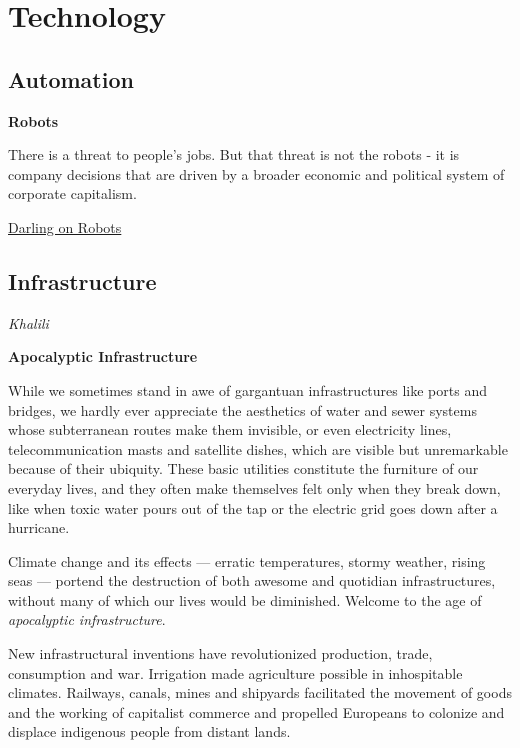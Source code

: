 \documentclass[
]{book}
\begin{document}
\hypertarget{technology}{%
\chapter{Technology}\label{technology}}

\hypertarget{automation}{%
\section{Automation}\label{automation}}

\textbf{Robots}

There is a threat to people's jobs. But that threat is not the robots - it is company decisions that are driven by a broader economic and political system of corporate capitalism.

\href{https://www.theguardian.com/technology/2021/apr/17/ai-ethicist-kate-darling-robots-can-be-our-partners}{Darling on Robots}

\hypertarget{infrastructure}{%
\section{Infrastructure}\label{infrastructure}}

\emph{Khalili}

\textbf{Apocalyptic Infrastructure}

While we sometimes stand in awe of gargantuan infrastructures like ports and bridges, we hardly ever appreciate the aesthetics of water and sewer systems whose subterranean routes make them invisible, or even electricity lines, telecommunication masts and satellite dishes, which are visible but unremarkable because of their ubiquity. These basic utilities constitute the furniture of our everyday lives, and they often make themselves felt only when they break down, like when toxic water pours out of the tap or the electric grid goes down after a hurricane.

Climate change and its effects --- erratic temperatures, stormy weather, rising seas --- portend the destruction of both awesome and quotidian infrastructures, without many of which our lives would be diminished. Welcome to the age of \emph{apocalyptic infrastructure}.

New infrastructural inventions have revolutionized production, trade, consumption and war. Irrigation made agriculture possible in inhospitable climates. Railways, canals, mines and shipyards facilitated the movement of goods and the working of capitalist commerce and propelled Europeans to colonize and displace indigenous people from distant lands.
\end{document}
